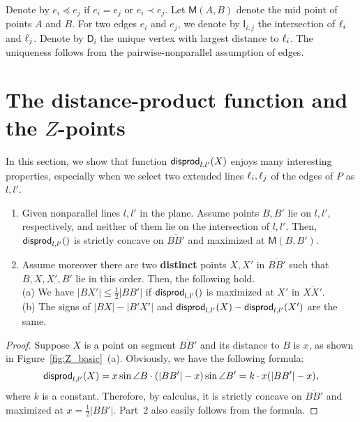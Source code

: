 \documentclass{ws-ijcga}
\begin{document}
\newcommand{\M}{\mathsf{M}}   %
\newcommand{\D}{\mathsf{D}}
\newcommand{\I}{\mathsf{I}}
Denote by $e_i\preceq e_j$ if $e_i=e_j$ or $e_i\prec e_j$.
Let $\M(A,B)$ denote the mid point of points $A$ and $B$.
For two edges $e_i$ and $e_j$, we denote by $\I_{i,j}$ the intersection of $\ell_i$ and $\ell_j$.
Denote by $\D_i$ the unique vertex with largest distance to $\ell_i$.
    The uniqueness follows from the pairwise-nonparallel assumption of edges.

\section{The distance-product function and the $Z$-points}\label{sect:Z}

In this section, we show that function $\mathsf{disprod}_{l,l'}(X)$ enjoys many interesting properties, especially when we select two extended lines $\ell_i,\ell_j$ of the edges of $P$ as $l,l'$.

\begin{lemma}\label{lemma:dist_concave}
\begin{enumerate}
\item Given nonparallel lines $l,l'$ in the plane. Assume points $B,B'$ lie on $l,l'$, respectively, and neither of them lie on the intersection of $l,l'$.
    Then, $\mathsf{disprod}_{l,l'}()$ is strictly concave on $\overline{BB'}$ and maximized at $\M(B,B')$.
\item Assume moreover there are two \textbf{distinct} points $X,X'$ in $\overline{BB'}$ such that $B,X,X',B'$ lie in this order.
Then, the following hold.\\
(a) We have $|BX'|\leq \frac{1}{2}|BB'|$ if $\mathsf{disprod}_{l,l'}()$ is maximized at $X'$ in $\overline{XX'}$.\\
(b) The signs of $|BX|-|B'X'|$ and $\mathsf{disprod}_{l,l'}(X)-\mathsf{disprod}_{l,l'}(X')$ are the same.
\end{enumerate}
\end{lemma}

\begin{proof}
Suppose $X$ is a point on segment $\overline{BB'}$ and its distance to $B$ is $x$, as shown in Figure~\ref{fig:Z_basic}~(a).
Obviously, we have the following formula:
\[\mathsf{disprod}_{l,l'}(X)= x \sin \angle B \cdot (|BB'|-x) \sin \angle B'= k\cdot x (|BB'|-x),\]
where $k$ is a constant.
Therefore, by calculus, it is strictly concave on $\overline{BB'}$ and maximized at $x=\frac{1}{2}|BB'|$.
Part~2 also easily follows from the formula.
\end{proof}
\end{document}
